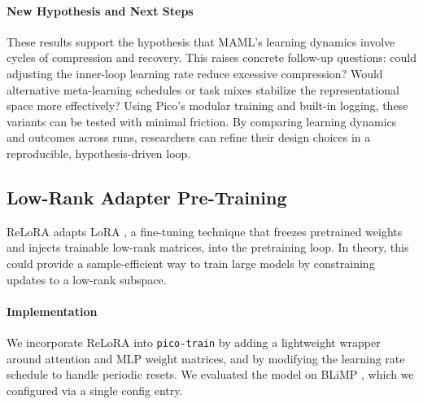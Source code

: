 \paragraph{New Hypothesis and Next Steps}
These results support the hypothesis that MAML's learning dynamics involve cycles of compression and recovery. This raises concrete follow-up questions: could adjusting the inner-loop learning rate reduce excessive compression? Would alternative meta-learning schedules or task mixes stabilize the representational space more effectively? Using Pico's modular training and built-in logging, these variants can be tested with minimal friction. By comparing learning dynamics and outcomes across runs, researchers can refine their design choices in a reproducible, hypothesis-driven loop.%


\subsection{Low-Rank Adapter Pre-Training}

ReLoRA \citep{lialin2023relora} adapts LoRA \citep{hu2021lora}, a fine-tuning technique that freezes pretrained weights and injects trainable low-rank matrices, into the pretraining loop. In theory, this could provide a sample-efficient way to train large models by constraining updates to a low-rank subspace. %

\paragraph{Implementation} We incorporate ReLoRA into \texttt{pico-train} by adding a lightweight wrapper around attention and MLP weight matrices, and by modifying the learning rate schedule to handle periodic resets. We evaluated the model on BLiMP \citep{warstadt2020blimp}, which we configured via a single config entry. %

